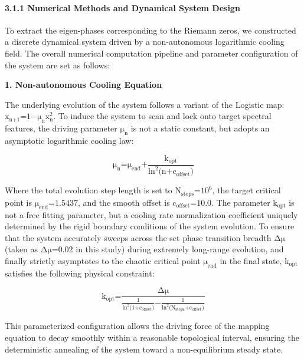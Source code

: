 \hypertarget{numerical-methods-and-dynamical-system-design}{%
\paragraph{3.1.1 Numerical Methods and Dynamical System
Design}\label{numerical-methods-and-dynamical-system-design}}

To extract the eigen-phases corresponding to the Riemann zeros, we
constructed a discrete dynamical system driven by a non-autonomous
logarithmic cooling field. The overall numerical computation pipeline
and parameter configuration of the system are set as follows:

\textbf{1. Non-autonomous Cooling Equation}

The underlying evolution of the system follows a variant of the Logistic
map:
\(\text{x}_{\text{n}\text{+1}}\text{=1−}\text{μ}_{\text{n}}\text{x}_{\text{n}}^{\text{2}}\).
To induce the system to scan and lock onto target spectral features, the
driving parameter \(\text{μ}_{\text{n}}\) is not a static constant, but
adopts an asymptotic logarithmic cooling law:

\[\text{μ}_{\text{n}}\text{=}\text{μ}_{\text{end}}\text{+}\frac{\text{k}_{\text{opt}}}{\text{ln}^{\text{2}}\text{(}\text{n}\text{+}\text{c}_{\text{offset}}\text{)}}\]

Where the total evolution step length is set to
\(\text{N}_{\text{steps}}\text{=}\text{10}^{\text{6}}\), the target
critical point is \(\text{μ}_{\text{end}}\text{=1.5437}\), and the
smooth offset is \(\text{c}_{\text{offset}}\text{=10.0}\). The parameter
\(\text{k}_{\text{opt}}\) is not a free fitting parameter, but a cooling
rate normalization coefficient uniquely determined by the rigid boundary
conditions of the system evolution. To ensure that the system accurately
sweeps across the set phase transition breadth \(\text{Δ}\text{μ}\)
(taken as \(\text{Δ}\text{μ}\text{=0.02}\) in this study) during
extremely long-range evolution, and finally strictly asymptotes to the
chaotic critical point \(\text{μ}_{\text{end}}\) in the final state,
\(\text{k}_{\text{opt}}\) satisfies the following physical constraint:

\[\text{k}_{\text{opt}}\text{=}\frac{\text{Δ}\text{μ}}{\frac{\text{1}}{\text{ln}^{\text{2}}\text{(1+}\text{c}_{\text{offset}}\text{)}}\text{−}\frac{\text{1}}{\text{ln}^{\text{2}}\text{(}\text{N}_{\text{steps}}\text{+}\text{c}_{\text{offset}}\text{)}}}\]

This parameterized configuration allows the driving force of the mapping
equation to decay smoothly within a reasonable topological interval,
ensuring the deterministic annealing of the system toward a
non-equilibrium steady state.

